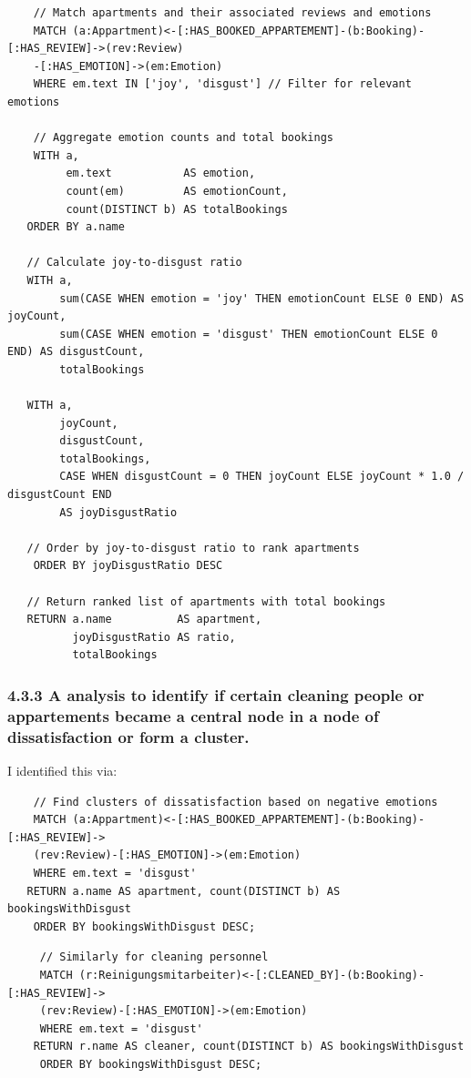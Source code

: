 \documentclass[
]{article}
\begin{document}
\begin{verbatim}
    // Match apartments and their associated reviews and emotions
    MATCH (a:Appartment)<-[:HAS_BOOKED_APPARTEMENT]-(b:Booking)-[:HAS_REVIEW]->(rev:Review)
    -[:HAS_EMOTION]->(em:Emotion)
    WHERE em.text IN ['joy', 'disgust'] // Filter for relevant emotions

    // Aggregate emotion counts and total bookings 
    WITH a, 
         em.text           AS emotion, 
         count(em)         AS emotionCount, 
         count(DISTINCT b) AS totalBookings
   ORDER BY a.name

   // Calculate joy-to-disgust ratio
   WITH a, 
        sum(CASE WHEN emotion = 'joy' THEN emotionCount ELSE 0 END) AS joyCount,
        sum(CASE WHEN emotion = 'disgust' THEN emotionCount ELSE 0 END) AS disgustCount,
        totalBookings

   WITH a, 
        joyCount,
        disgustCount, 
        totalBookings,
        CASE WHEN disgustCount = 0 THEN joyCount ELSE joyCount * 1.0 / disgustCount END 
        AS joyDisgustRatio

   // Order by joy-to-disgust ratio to rank apartments
    ORDER BY joyDisgustRatio DESC

   // Return ranked list of apartments with total bookings
   RETURN a.name          AS apartment, 
          joyDisgustRatio AS ratio, 
          totalBookings
\end{verbatim}

\subsubsection{4.3.3 A analysis to identify if certain cleaning people
or appartements became a central node in a node of dissatisfaction or
form a
cluster.}\label{a-analysis-to-identify-if-certain-cleaning-people-or-appartements-became-a-central-node-in-a-node-of-dissatisfaction-or-form-a-cluster.}

I identified this via:

\begin{verbatim}
    // Find clusters of dissatisfaction based on negative emotions
    MATCH (a:Appartment)<-[:HAS_BOOKED_APPARTEMENT]-(b:Booking)-[:HAS_REVIEW]->
    (rev:Review)-[:HAS_EMOTION]->(em:Emotion)
    WHERE em.text = 'disgust'
   RETURN a.name AS apartment, count(DISTINCT b) AS bookingsWithDisgust
    ORDER BY bookingsWithDisgust DESC;
\end{verbatim}

\begin{verbatim}
     // Similarly for cleaning personnel
     MATCH (r:Reinigungsmitarbeiter)<-[:CLEANED_BY]-(b:Booking)-[:HAS_REVIEW]->
     (rev:Review)-[:HAS_EMOTION]->(em:Emotion)
     WHERE em.text = 'disgust'
    RETURN r.name AS cleaner, count(DISTINCT b) AS bookingsWithDisgust
     ORDER BY bookingsWithDisgust DESC;
\end{verbatim}
\end{document}
